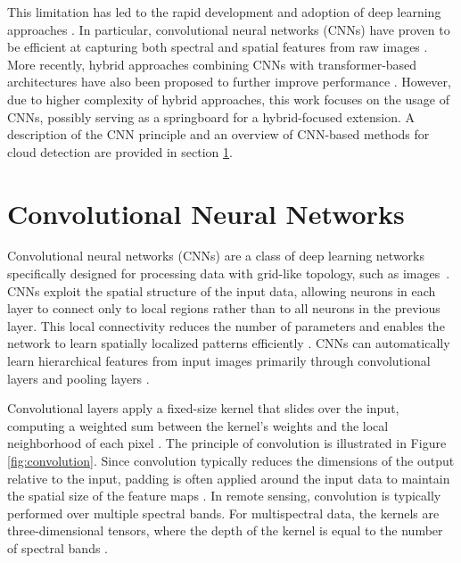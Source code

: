 This limitation has led to the rapid development and adoption of deep learning approaches \cite{wang2024}. In particular, convolutional neural networks (CNNs) have proven to be efficient at capturing both spectral and spatial features from raw images \cite{pesek2022, zhu2017}. More recently, hybrid approaches combining CNNs with transformer-based architectures have also been proposed to further improve performance \cite{zhang2022, luo2025}. However, due to higher complexity of hybrid approaches, this work focuses on the usage of CNNs, possibly serving as a springboard for a hybrid-focused extension. A description of the CNN principle and an overview of CNN-based methods for cloud detection are provided in section \ref{sec:cnn}.


\section{Convolutional Neural Networks}
\label{sec:cnn} 

Convolutional neural networks (CNNs) are a class of deep learning networks specifically designed for processing data with grid-like topology, such as images~\cite{goodfellow2016, lecun1998}. CNNs exploit the spatial structure of the input data, allowing neurons in each layer to connect only to local regions rather than to all neurons in the previous layer. This local connectivity reduces the number of parameters and enables the network to learn spatially localized patterns efficiently \cite{lecun1998}. CNNs can automatically learn hierarchical features from input images primarily through convolutional layers and pooling layers \cite{goodfellow2016}. 

Convolutional layers apply a fixed-size kernel that slides over the input, computing a weighted sum between the kernel's weights and the local neighborhood of each pixel \cite{goodfellow2016}. The principle of convolution is illustrated in Figure \ref{fig:convolution}. Since convolution typically reduces the dimensions of the output relative to the input, padding is often applied around the input data to maintain the spatial size of the feature maps \cite{goodfellow2016}. In remote sensing, convolution is typically performed over multiple spectral bands. For multispectral data, the kernels are three-dimensional tensors, where the depth of the kernel is equal to the number of spectral bands \cite{zhu2017}. 
 

